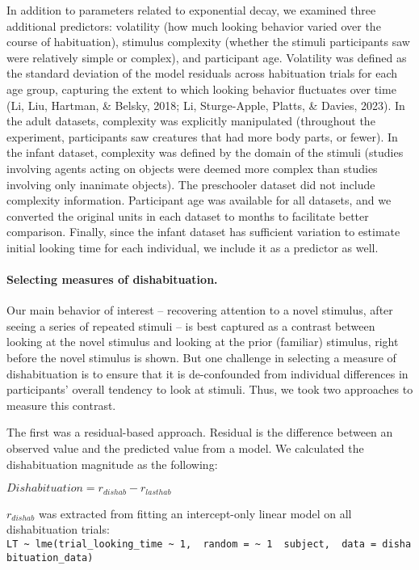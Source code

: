 \documentclass[10pt, letterpaper]{article}
\begin{document}
In addition to parameters related to exponential decay, we examined
three additional predictors: volatility (how much looking behavior
varied over the course of habituation), stimulus complexity (whether the
stimuli participants saw were relatively simple or complex), and
participant age. Volatility was defined as the standard deviation of the
model residuals across habituation trials for each age group, capturing
the extent to which looking behavior fluctuates over time (Li, Liu,
Hartman, \& Belsky, 2018; Li, Sturge-Apple, Platts, \& Davies, 2023). In
the adult datasets, complexity was explicitly manipulated (throughout
the experiment, participants saw creatures that had more body parts, or
fewer). In the infant dataset, complexity was defined by the domain of
the stimuli (studies involving agents acting on objects were deemed more
complex than studies involving only inanimate objects). The preschooler
dataset did not include complexity information. Participant age was
available for all datasets, and we converted the original units in each
dataset to months to facilitate better comparison. Finally, since the
infant dataset has sufficient variation to estimate initial looking time
for each individual, we include it as a predictor as well.

\hypertarget{selecting-measures-of-dishabituation.}{%
\paragraph{Selecting measures of
dishabituation.}\label{selecting-measures-of-dishabituation.}}

Our main behavior of interest -- recovering attention to a novel
stimulus, after seeing a series of repeated stimuli -- is best captured
as a contrast between looking at the novel stimulus and looking at the
prior (familiar) stimulus, right before the novel stimulus is shown. But
one challenge in selecting a measure of dishabituation is to ensure that
it is de-confounded from individual differences in participants' overall
tendency to look at stimuli. Thus, we took two approaches to measure
this contrast.

The first was a residual-based approach. Residual is the difference
between an observed value and the predicted value from a model. We
calculated the dishabituation magnitude as the following:

\(Dishabituation = r_{dishab} - r_{lasthab}\)

\(r_{dishab}\) was extracted from fitting an intercept-only linear model
on all dishabituation trials:
\texttt{LT\ \textasciitilde{}\ lme(trial\_looking\_time\ \textasciitilde{}\ 1,\ \ random\ =\ \textasciitilde{}\ 1\ \textbar{}\ subject,\ \ data\ =\ dishabituation\_data)}
\end{document}
